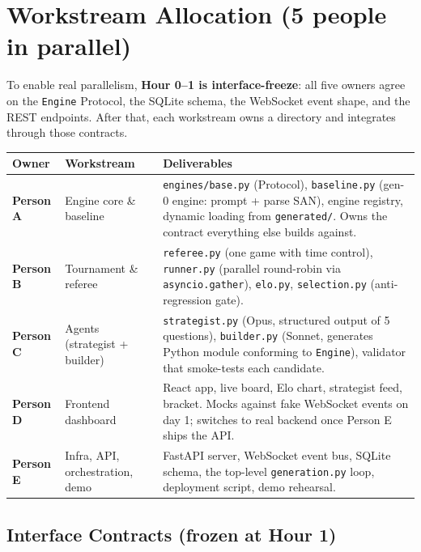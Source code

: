 \documentclass[11pt]{article}
\begin{document}
\section{Workstream Allocation (5 people in parallel)}

To enable real parallelism, \textbf{Hour 0--1 is interface-freeze}: all five owners agree on the \texttt{Engine} Protocol, the SQLite schema, the WebSocket event shape, and the REST endpoints. After that, each workstream owns a directory and integrates through those contracts.

\begin{center}
\renewcommand{\arraystretch}{1.3}
\begin{tabular}{@{}p{}p{}p{}@{}}
\toprule
\textbf{Owner} & \textbf{Workstream} & \textbf{Deliverables} \\
\midrule
\textbf{Person A} & Engine core \& baseline & \texttt{engines/base.py} (Protocol), \texttt{baseline.py} (gen-0 engine: prompt + parse SAN), engine registry, dynamic loading from \texttt{generated/}. Owns the contract everything else builds against. \\
\textbf{Person B} & Tournament \& referee & \texttt{referee.py} (one game with time control), \texttt{runner.py} (parallel round-robin via \texttt{asyncio.gather}), \texttt{elo.py}, \texttt{selection.py} (anti-regression gate). \\
\textbf{Person C} & Agents (strategist + builder) & \texttt{strategist.py} (Opus, structured output of 5 questions), \texttt{builder.py} (Sonnet, generates Python module conforming to \texttt{Engine}), validator that smoke-tests each candidate. \\
\textbf{Person D} & Frontend dashboard & React app, live board, Elo chart, strategist feed, bracket. Mocks against fake WebSocket events on day 1; switches to real backend once Person E ships the API. \\
\textbf{Person E} & Infra, API, orchestration, demo & FastAPI server, WebSocket event bus, SQLite schema, the top-level \texttt{generation.py} loop, deployment script, demo rehearsal. \\
\bottomrule
\end{tabular}
\end{center}

\subsection{Interface Contracts (frozen at Hour 1)}
\end{document}
